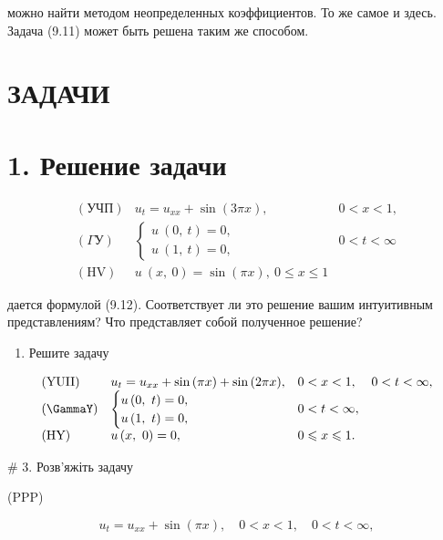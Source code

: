 \documentclass[
  ukrainian,
]{article}
\providecommand{\tightlist}{%
  \setlength{\itemsep}{0pt}\setlength{\parskip}{0pt}}
\begin{document}
можно найти методом неопределенных коэффициентов. То же самое и здесь.
Задача (9.11) может быть решена таким же способом.

\section{ЗАДАЧИ}\label{ux437ux430ux434ux430ux447ux438}

\section{1. Решение
задачи}\label{ux440ux435ux448ux435ux43dux438ux435-ux437ux430ux434ux430ux447ux438}

\[
\begin{array}{lll} (\text{УЧП}) & u_t = u_{xx} + \sin{(3\pi x)}, & 0 < x < 1, \\ (\Gamma \text{У}) & \begin{cases} u \ (0, \ t) = 0, \\ u \ (1, \ t) = 0, \end{cases} & 0 < t < \infty \\ (\text{HV}) & u \ (x, \ 0) = \sin{(\pi x)}, \ 0 \leqslant x \leqslant 1 \end{array}
\]

дается формулой (9.12). Соответствует ли это решение вашим интуитивным
представлениям? Что представляет собой полученное решение?

\begin{enumerate}
\def\labelenumi{\arabic{enumi}.}
\setcounter{enumi}{1}
\tightlist
\item
  Решите задачу
\end{enumerate}

\[
\begin{array}{llll} (\text{YUII}) & u_t = u_{xx} + \sin{(\pi x)} + \sin{(2\pi x)}, & 0 < x < 1, & 0 <t < \infty, \\ (\text{\GammaY}) & \begin{cases} u\left(0,\ t\right) = 0, \\ u\left(1,\ t\right) = 0, \end{cases} & 0 < t < \infty, \\ (\text{HY}) & u\left(x,\ 0\right) = 0, & 0 \leqslant x \leqslant 1. \end{array}
\]

\# 3. Розв'яжіть задачу

(PPP)

\[
u_t = u_{xx} + \sin(\pi x), \quad 0 < x < 1, \quad 0 < t < \infty,
\]
\end{document}
